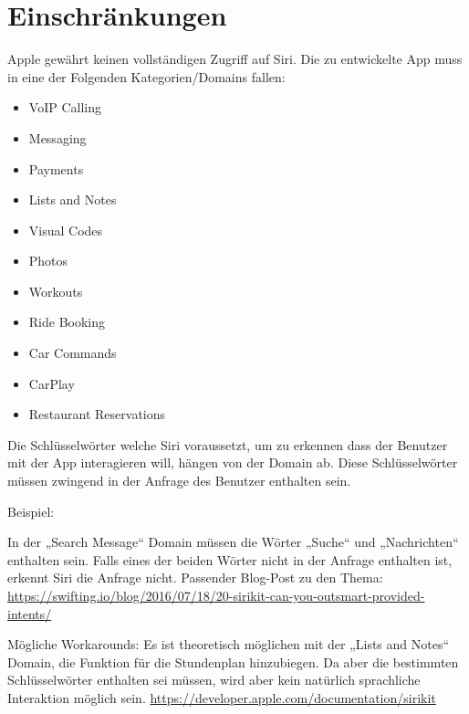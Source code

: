 \section{Einschränkungen}

Apple gewährt keinen vollständigen Zugriff auf Siri. Die zu entwickelte App muss in eine der Folgenden Kategorien/Domains fallen:
\begin{itemize}
\item VoIP Calling 
\item Messaging
\item Payments
\item Lists and Notes
\item Visual Codes
\item Photos
\item Workouts
\item Ride Booking
\item Car Commands
\item CarPlay
\item Restaurant Reservations
\end{itemize}

\newpage

Die Schlüsselwörter welche Siri voraussetzt, um zu erkennen dass der Benutzer mit der App interagieren will, hängen von der Domain ab.
Diese Schlüsselwörter müssen zwingend in der Anfrage des Benutzer enthalten sein. 

Beispiel: 

In der „Search Message“  Domain müssen die Wörter „Suche“ und „Nachrichten“ enthalten sein. Falls eines der beiden Wörter nicht in der Anfrage enthalten ist, erkennt Siri die Anfrage nicht.  \newline
Passender Blog-Post zu den Thema: \newline
\url{https://swifting.io/blog/2016/07/18/20-sirikit-can-you-outsmart-provided-intents/}

Mögliche Workarounds: \newline
Es ist theoretisch möglichen mit der „Lists and Notes“ Domain, die Funktion für die Stundenplan hinzubiegen. Da aber die bestimmten Schlüsselwörter enthalten sei müssen, wird aber kein natürlich sprachliche Interaktion möglich sein.
\url{https://developer.apple.com/documentation/sirikit}
